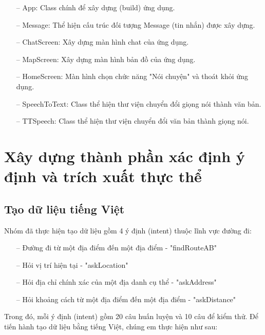\begin{itemize}
    \item[--] App: Class chính để xây dựng (build) ứng dụng.
    \item[--] Message: Thể hiện cấu trúc đối tượng Message (tin nhắn) được xây dựng. 
    \item[--] ChatScreen: Xây dựng màn hình chat của ứng dụng.
    \item[--] MapScreen: Xây dựng màn hình bản đồ của ứng dụng.
    \item[--] HomeScreen: Màn hình chọn chức năng "Nói chuyện" và thoát khỏi ứng dụng.
    \item[--] SpeechToText: Class thể hiện thư viện chuyển đổi giọng nói thành văn bản.  
    \item[--] TTSpeech: Class thể hiện thư viện chuyển đổi văn bản thành giọng nói.  
\end{itemize}


\section{Xây dựng thành phần xác định ý định và trích xuất thực thể}
\subsection{Tạo dữ liệu tiếng Việt}
Nhóm đã thực hiện tạo dữ liệu gồm 4 ý định (intent) thuộc lĩnh vực đường đi:

\begin{itemize}
    \item[--] Đường đi từ một địa điểm đến một địa điểm - "findRouteAB"
    \item[--] Hỏi vị trí hiện tại - "askLocation"
    \item[--] Hỏi địa chỉ chính xác của một địa danh cụ thể - "askAddress"
    \item[--] Hỏi khoảng cách từ một địa điểm đến một địa điểm - "askDistance"
\end{itemize}

Trong đó, mỗi ý định (intent) gồm 20 câu huấn luyện và 10 câu để kiểm thử. Để tiến hành tạo dữ liệu bằng tiếng Việt, chúng em thực hiện như sau:

